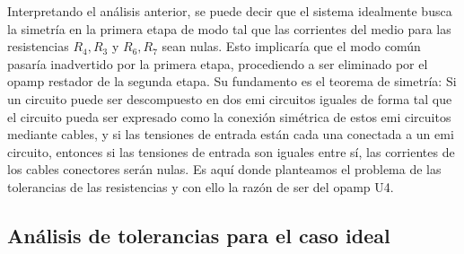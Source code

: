 \documentclass[../../tc_tp3_main.tex]{subfiles}
\begin{document}
 	Interpretando el análisis anterior, se puede decir que el sistema idealmente busca la simetría en la primera etapa de modo tal que las corrientes del medio para las resistencias $R_4, R_3$ y $R_6, R_7$ sean nulas. Esto implicaría que el modo común pasaría inadvertido por la primera etapa, procediendo a ser eliminado por el opamp restador de la segunda etapa. Su fundamento es el teorema de simetría: Si un circuito puede ser descompuesto en dos emi circuitos iguales de forma tal que el circuito pueda ser expresado como la conexión simétrica de estos emi circuitos mediante cables, y si las tensiones de entrada están cada una conectada a un emi circuito, entonces si las tensiones de entrada son iguales entre sí, las corrientes de los cables conectores serán nulas. Es aquí donde planteamos el problema de las tolerancias de las resistencias y con ello la razón de ser del opamp U4.
 	
\subsection{Análisis de tolerancias para el caso ideal}
\end{document}
